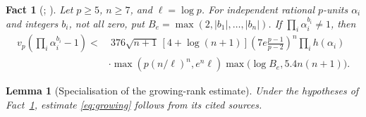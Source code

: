 \documentclass{amsart}
\newtheorem{lemma}{Lemma}[section]
\newtheorem{fact}{Fact}
\theoremstyle{remark}
\numberwithin{equation}{section}
\begin{document}
\begin{fact}[{\cite[Lemma~3.1, pp.~301--302]{Stewart2013};
\cite[Main theorem, (1.18), p.~321]{Yu2013}}]\label{fact:growing}
Let $p\ge5$, $n\ge7$, and $\ell=\log p$.
For independent rational $p$-units $\alpha_i$ and integers $b_i$, not all
zero, put $B_e=\max(2,|b_1|,\ldots,|b_n|)$.
If $\prod_i\alpha_i^{b_i}\ne1$, then
\begin{equation}\label{eq:growing}
\begin{split}
v_p\left(\prod_i\alpha_i^{b_i}-1\right)
<&\ 376\sqrt{n+1}\,[4+\log(n+1)]
 \left(7e\frac{p-1}{p-2}\right)^n\prod_i h(\alpha_i)\\
&\cdot\max\left(p(n/\ell)^n,e^n\ell\right)
 \max\bigl(\log B_e,5.4n(n+1)\bigr).
\end{split}
\end{equation}
\end{fact}
\begin{lemma}[Specialisation of the growing-rank estimate]\label{lem:growing-specialisation}
Under the hypotheses of Fact~\ref{fact:growing}, estimate \eqref{eq:growing}
follows from its cited sources.
\end{lemma}
\end{document}
